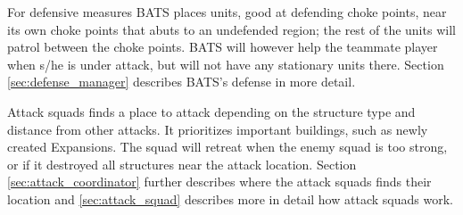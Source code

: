 For defensive measures BATS places units, good at defending choke points, near its own choke points that abuts to an undefended region; the rest of the units will patrol between the choke points. BATS will however help the teammate player when s/he is under attack, but will not have any stationary units there. Section \ref{sec:defense_manager}  describes BATS's defense in more detail.

Attack squads finds a place to attack depending on the structure type and distance from other attacks. It prioritizes important buildings, such as newly created Expansions. The squad will retreat when the enemy squad is too strong, or if it destroyed all structures near the attack location. Section \ref{sec:attack_coordinator}  further describes where the attack squads finds their location and \ref{sec:attack_squad}  describes more in detail how attack squads work.